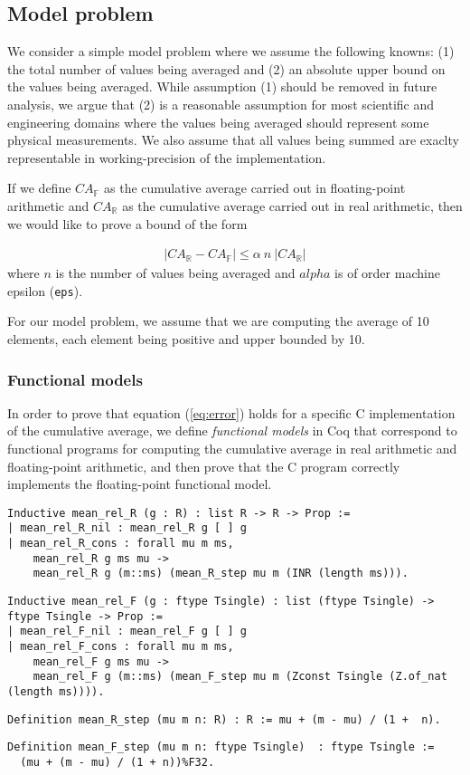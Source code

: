 \documentclass{llncs}
\begin{document}
\subsection{Model problem}

We consider a simple model problem where we assume the following knowns: (1) the total number of values being averaged and (2) an absolute upper bound on the values being averaged. While assumption (1) should be removed in future analysis, we argue that (2)  is a reasonable assumption for most scientific and engineering domains where the values being averaged should represent some physical measurements. We also assume that all values being summed are exaclty representable in working-precision of the implementation. 

If we define $CA_\mathbb{F} $ as the cumulative average carried out in floating-point arithmetic and $CA_\mathbb{R}$ as the cumulative average carried out in real arithmetic, then we would like to prove a bound of the form

\begin{align}\label{eq:error}
|CA_\mathbb{R} - CA_\mathbb{F}| \le \alpha \  n \  |CA_\mathbb{R}|
\end{align}
where $n$ is the number of values being averaged and $alpha$ is of order machine epsilon (\texttt{eps}). 

For our model problem, we assume that we are computing the average of 10 elements, each element being positive and upper bounded by 10.

\subsubsection{Functional models}
In order to prove that equation (\ref{eq:error}) holds for a specific C implementation of the cumulative average, we define   \emph{functional models} in Coq that correspond to functional programs for computing the cumulative average in real arithmetic and floating-point arithmetic, and then prove that the C program correctly implements the floating-point functional model. 

\begin{lstlisting}
Inductive mean_rel_R (g : R) : list R -> R -> Prop :=
| mean_rel_R_nil : mean_rel_R g [ ] g
| mean_rel_R_cons : forall mu m ms,
    mean_rel_R g ms mu ->
    mean_rel_R g (m::ms) (mean_R_step mu m (INR (length ms))).
\end{lstlisting}

\begin{lstlisting}
Inductive mean_rel_F (g : ftype Tsingle) : list (ftype Tsingle) -> ftype Tsingle -> Prop :=
| mean_rel_F_nil : mean_rel_F g [ ] g
| mean_rel_F_cons : forall mu m ms,
    mean_rel_F g ms mu ->
    mean_rel_F g (m::ms) (mean_F_step mu m (Zconst Tsingle (Z.of_nat (length ms)))).
\end{lstlisting}


\begin{lstlisting}
Definition mean_R_step (mu m n: R) : R := mu + (m - mu) / (1 +  n).
\end{lstlisting}

\begin{lstlisting}
Definition mean_F_step (mu m n: ftype Tsingle)  : ftype Tsingle :=
  (mu + (m - mu) / (1 + n))%F32.
\end{lstlisting}




%
\end{document}
